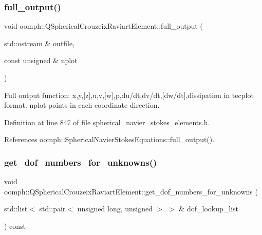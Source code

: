 \subsubsection{\texorpdfstring{full\+\_\+output()}{full\_output()}\hspace{0.1cm}{\footnotesize\ttfamily [2/2]}}
{\footnotesize\ttfamily void oomph\+::\+Q\+Spherical\+Crouzeix\+Raviart\+Element\+::full\+\_\+output (\begin{DoxyParamCaption}\item[{std\+::ostream \&}]{outfile,  }\item[{const unsigned \&}]{nplot }\end{DoxyParamCaption})\hspace{0.3cm}{\ttfamily [inline]}}



Full output function\+: x,y,\mbox{[}z\mbox{]},u,v,\mbox{[}w\mbox{]},p,du/dt,dv/dt,\mbox{[}dw/dt\mbox{]},dissipation in tecplot format. nplot points in each coordinate direction. 



Definition at line 847 of file spherical\+\_\+navier\+\_\+stokes\+\_\+elements.\+h.



References oomph\+::\+Spherical\+Navier\+Stokes\+Equations\+::full\+\_\+output().

\mbox{\label{classoomph_1_1QSphericalCrouzeixRaviartElement_ac6a63310d1f2e4de8c0310c86c2aa9f9}} 
\subsubsection{\texorpdfstring{get\+\_\+dof\+\_\+numbers\+\_\+for\+\_\+unknowns()}{get\_dof\_numbers\_for\_unknowns()}}
{\footnotesize\ttfamily void oomph\+::\+Q\+Spherical\+Crouzeix\+Raviart\+Element\+::get\+\_\+dof\+\_\+numbers\+\_\+for\+\_\+unknowns (\begin{DoxyParamCaption}\item[{std\+::list$<$ std\+::pair$<$ unsigned long, unsigned $>$ $>$ \&}]{dof\+\_\+lookup\+\_\+list }\end{DoxyParamCaption}) const\hspace{0.3cm}{\ttfamily [virtual]}}



